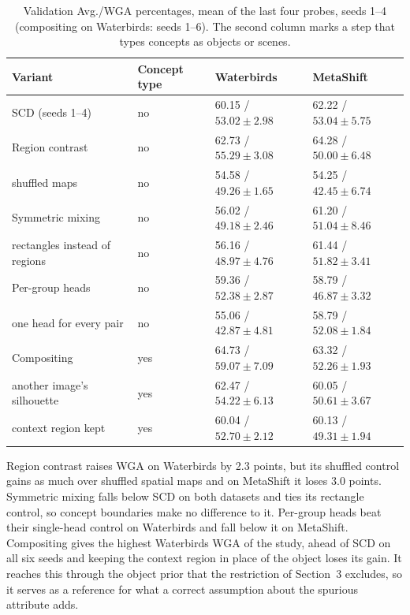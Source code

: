 \documentclass{article}
\begin{document}
\begin{table}[htbp]
\centering\small
\caption{Validation Avg./WGA percentages, mean of the last four probes, seeds 1--4 (compositing on Waterbirds: seeds 1--6). The second column marks a step that types concepts as objects or scenes.}
\begin{tabular}{llll}
\toprule
Variant & Concept type & Waterbirds & MetaShift \\
\midrule
SCD (seeds 1--4) & no & 60.15 / $53.02\pm2.98$ & 62.22 / $53.04\pm5.75$ \\
Region contrast & no & 62.73 / $55.29\pm3.08$ & 64.28 / $50.00\pm6.48$ \\
\quad shuffled maps & no & 54.58 / $49.26\pm1.65$ & 54.25 / $42.45\pm6.74$ \\
Symmetric mixing & no & 56.02 / $49.18\pm2.46$ & 61.20 / $51.04\pm8.46$ \\
\quad rectangles instead of regions & no & 56.16 / $48.97\pm4.76$ & 61.44 / $51.82\pm3.41$ \\
Per-group heads & no & 59.36 / $52.38\pm2.87$ & 58.79 / $46.87\pm3.32$ \\
\quad one head for every pair & no & 55.06 / $42.87\pm4.81$ & 58.79 / $52.08\pm1.84$ \\
Compositing & yes & 64.73 / $59.07\pm7.09$ & 63.32 / $52.26\pm1.93$ \\
\quad another image's silhouette & yes & 62.47 / $54.22\pm6.13$ & 60.05 / $50.61\pm3.67$ \\
\quad context region kept & yes & 60.04 / $52.70\pm2.12$ & 60.13 / $49.31\pm1.94$ \\
\bottomrule
\end{tabular}
\label{tab:extensions}
\end{table}

Region contrast raises WGA on Waterbirds by 2.3 points, but its shuffled control gains as much over shuffled spatial maps and on MetaShift it loses 3.0 points. Symmetric mixing falls below SCD on both datasets and ties its rectangle control, so concept boundaries make no difference to it. Per-group heads beat their single-head control on Waterbirds and fall below it on MetaShift. Compositing gives the highest Waterbirds WGA of the study, ahead of SCD on all six seeds and keeping the context region in place of the object loses its gain. It reaches this through the object prior that the restriction of Section~3 excludes, so it serves as a reference for what a correct assumption about the spurious attribute adds.
\end{document}
